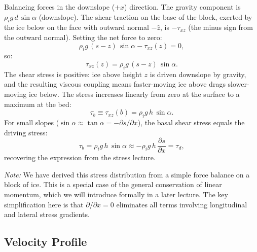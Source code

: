 \documentclass[11pt]{article}
\begin{document}
\noindent Balancing forces in the downslope ($+x$) direction.  The gravity component is $\rho_i g\,d\,\sin\alpha$ (downslope).  The shear traction on the base of the block, exerted by the ice below on the face with outward normal $-\hat{z}$, is $-\tau_{xz}$ (the minus sign from the outward normal).  Setting the net force to zero:
\begin{equation}
  \rho_i g\,(s - z)\,\sin\alpha - \tau_{xz}(z) = 0,
\end{equation}
so:
\begin{equation}
  \boxed{\tau_{xz}(z) = \rho_i g\,(s - z)\,\sin\alpha.}
  \label{eq:slab_stress}
\end{equation}
The shear stress is positive: ice above height $z$ is driven downslope by gravity, and the resulting viscous coupling means faster-moving ice above drags slower-moving ice below.  The stress increases linearly from zero at the surface to a maximum at the bed:
\begin{equation}
  \tau_b \equiv \tau_{xz}(b) = \rho_i g\,h\,\sin\alpha.
  \label{eq:basal_shear}
\end{equation}
For small slopes ($\sin\alpha \approx \tan\alpha = -\partial s/\partial x$), the basal shear stress equals the driving stress:
\begin{equation}
  \tau_b = \rho_i g\,h\,\sin\alpha \approx -\rho_i g\,h\,\frac{\partial s}{\partial x} = \tau_d,
\end{equation}
recovering the expression from the stress lecture.

\medskip
\noindent\emph{Note:} We have derived this stress distribution from a simple force balance on a block of ice.  This is a special case of the general conservation of linear momentum, which we will introduce formally in a later lecture.  The key simplification here is that $\partial/\partial x = 0$ eliminates all terms involving longitudinal and lateral stress gradients.

\subsection{Velocity Profile}
\label{sec:velocity_profile}
\end{document}
